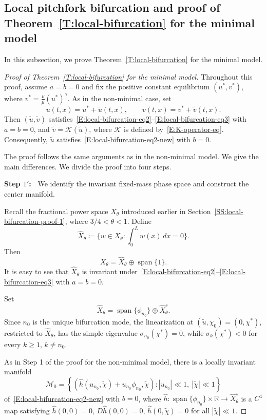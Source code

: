 \documentclass[11pt]{article} %
\theoremstyle{remark}
\theoremstyle{remark}
\numberwithin{equation}{section}
\numberwithin{figure}{section}
\numberwithin{table}{section}
\begin{document}
\subsection{Local pitchfork bifurcation and proof of Theorem~\ref{T:local-bifurcation} for the minimal model}
\label{SS:local-bifurcation-proof-2}

In this subsection, we prove Theorem~\ref{T:local-bifurcation} for the minimal
model.

\begin{proof}[Proof of Theorem~\ref{T:local-bifurcation} for the minimal model]
  Throughout this proof, assume $a = b = 0$ and fix the positive constant
  equilibrium $(u^*,v^*)$, where $v^* = \frac{\nu}{\mu}(u^*)^\gamma$. As in the
  non-minimal case, set
  \[
    u(t,x)=u^*+\widetilde{u}(t,x),\qquad
    v(t,x)=v^*+\widetilde{v}(t,x).
  \]
  Then $(\widetilde{u},\widetilde{v})$
  satisfies~\eqref{E:local-bifurcation-eq2}--\eqref{E:local-bifurcation-eq3}
  with $a = b = 0$, and $\widetilde{v} = \mathcal{K}(\widetilde{u})$, where
  $\mathcal{K}$ is defined by~\eqref{E:K-operator-eq}. Consequently, $\widetilde{u}$ satisfies~\eqref{E:local-bifurcation-eq2-new} with $b = 0$.

  The proof follows the same arguments as in the non-minimal model. We give the
  main differences. We divide the proof into four steps.

  \smallskip

  \noindent\textbf{Step $1'$:~} We identify the invariant fixed-mass phase space
  and construct the center manifold.

  \smallskip

  Recall the fractional power space $X_\theta$ introduced earlier in
  Section~\ref{SS:local-bifurcation-proof-1}, where $3/4 < \theta < 1$. Define
  \[
    \hat{X}_\theta
    \coloneqq
    \big\{w\in X_\theta:\int_0^L w(x)\,dx=0\big\}.
  \]
  Then
  \[
    X_\theta=\hat{X}_\theta\oplus\operatorname{span}\{1\}.
  \]
  It is easy to see that $\hat{X}_\theta$ is invariant
  under~\eqref{E:local-bifurcation-eq2}--\eqref{E:local-bifurcation-eq3} with $a
  = b = 0$.

  Set
  \[
    \hat{X}_\theta
    =\operatorname{span}\{\phi_{n_0}\}\oplus\hat{X}_\theta^s.
  \]
  Since $n_0$ is the unique bifurcation mode, the linearization at $(\widetilde{u},\chi_0) = (0,\chi^*)$, restricted to $\hat{X}_\theta$, has the simple
  eigenvalue $\sigma_{n_0}(\chi^*) = 0$, while $\sigma_k(\chi^*) < 0$ for every
  $k
  \ge 1$, $k \ne n_0$.

  As in Step 1 of the proof for the non-minimal model, there is a locally
  invariant manifold
  \[
    \mathcal{M}_0
    =\left\{
    \left(\hat{h}(u_{n_0},\widetilde{\chi})+u_{n_0}\phi_{n_0},\widetilde{\chi}\right):
    |u_{n_0}|\ll1,\ |\widetilde{\chi}|\ll1
    \right\}
  \]
  of~\eqref{E:local-bifurcation-eq2-new} with $b = 0$, where $\hat{h}:\operatorname{span}\{\phi_{n_0}\}\times\mathbb{R} \longrightarrow \hat{X}_\theta^s$ is a $C^4$ map satisfying $\hat{h}(0, 0) = 0$, $D\hat{h}(0, 0) = 0$,
  $\hat{h}(0, \widetilde{\chi}) = 0$ for all $|\widetilde{\chi}|\ll1$.


\end{proof}
\end{document}

